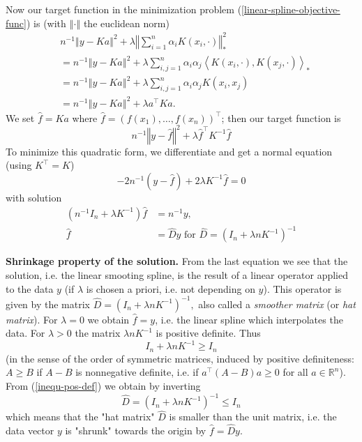 \documentclass[11pt,twoside]{article}%
\theoremstyle{change}
\begin{document}
Now our target function in the minimization problem
(\ref{linear-spline-objective-func}) is (with $\left\Vert \cdot\right\Vert $
the euclidean norm)
\begin{align*}
& n^{-1}\left\Vert y-Ka\right\Vert ^{2}+\lambda\left\Vert \sum_{i=1}^{n}%
\alpha_{i}K\left(  x_{i},\cdot\right)  \right\Vert _{\ast}^{2}\\
& =n^{-1}\left\Vert y-Ka\right\Vert ^{2}+\lambda\sum_{i,j=1}^{n}\alpha
_{i}\alpha_{j}\left\langle K\left(  x_{i},\cdot\right)  ,K\left(  x_{j}%
,\cdot\right)  \right\rangle _{\ast}\\
& =n^{-1}\left\Vert y-Ka\right\Vert ^{2}+\lambda\sum_{i,j=1}^{n}\alpha
_{i}\alpha_{j}K\left(  x_{i},x_{j}\right) \\
& =n^{-1}\left\Vert y-Ka\right\Vert ^{2}+\lambda a^{\top}Ka.
\end{align*}
We set $\hat{f}=Ka$ where $\hat{f}=\left(  f\left(  x_{1}\right)
,\ldots,f\left(  x_{n}\right)  \right)  ^{\top}$; then our target function is
\begin{equation}
n^{-1}\left\Vert y-\hat{f}\right\Vert ^{2}+\lambda\hat{f}^{\top}K^{-1}\hat
{f}\label{targ-func-smoo-spli}%
\end{equation}
To minimize this quadratic form, we differentiate and get a normal equation
(using $K^{\top}=K$)
\[
-2n^{-1}\left(  y-\hat{f}\right)  +2\lambda K^{-1}\hat{f}=0
\]
with solution
\begin{align}
\left(  n^{-1}I_{n}+\lambda K^{-1}\right)  \hat{f}  & =n^{-1}y,\nonumber\\
\hat{f}  & =\hat{D}y\text{ for }\hat{D}=\left(  I_{n}+\lambda nK^{-1}\right)
^{-1}\label{solution-lin-smooth-spline}%
\end{align}


\textbf{Shrinkage property of the solution.} From the last equation we see
that the solution, i.e. the linear smooting spline, is the result of a linear
operator applied to the data $y$ (if $\lambda$ is chosen a priori, i.e. not
depending on $y$). This operator is given by the matrix $\hat{D}=\left(
I_{n}+\lambda nK^{-1}\right)  ^{-1},$ also called a \textit{smoother matrix}
(or \textit{hat matrix}). For $\lambda=0$ we obtain $\hat{f}=y$, i.e. the
linear spline which interpolates the data. For $\lambda>0$ the matrix $\lambda
nK^{-1}$ is positive definite. Thus
\begin{equation}
I_{n}+\lambda nK^{-1}\geq I_{n}\label{inequ-pos-def}%
\end{equation}
(in the sense of the order of symmetric matrices, induced by positive
definiteness: $A\geq B$ if $A-B$ is nonnegative definite, i.e. if $a^{\top
}\left(  A-B\right)  a\geq0$ for all $a\in\mathbb{R}^{n}$). From
(\ref{inequ-pos-def}) we obtain by inverting
\[
\hat{D}=\left(  I_{n}+\lambda nK^{-1}\right)  ^{-1}\leq I_{n}%
\]
which means that the "hat matrix" $\hat{D}$ is smaller than the unit matrix,
i.e. the data vector $y$ is "shrunk" towards the origin by $\hat{f}=\hat{D}%
y$.\bigskip\bigskip
\end{document}
